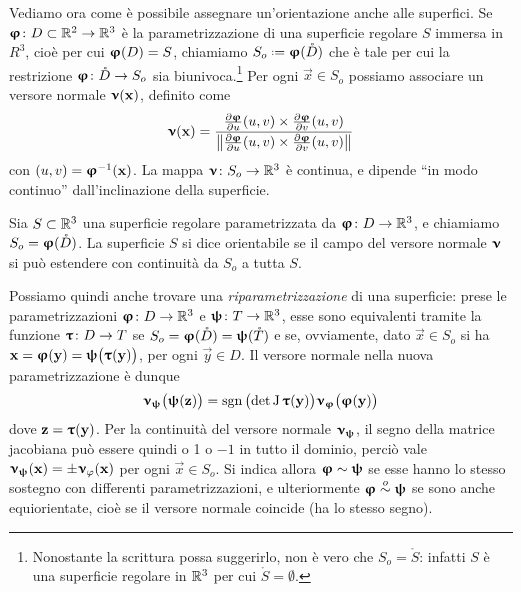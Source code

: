 Vediamo ora come è possibile assegnare un'orientazione anche alle superfici.
Se $\bm{\upvarphi}\colon D\subset\mathbb{R}^2\to\mathbb{R}^3$ è la parametrizzazione di una superficie regolare $S$ immersa in $R^3$, cioè per cui $\bm{\upvarphi}(D)=S$, chiamiamo $S_o\defeq\vphi(\mathring{D})$ che è tale per cui la restrizione $\bm{\upvarphi}\colon\mathring{D}\to S_o$ sia biunivoca.\footnote{
	Nonostante la scrittura possa suggerirlo, non è vero che $S_o=\mathring{S}$: infatti $S$ è una superficie regolare in $\mathbb{R}^3$ per cui $\mathring{S}=\emptyset$.
}
Per ogni $\vec x\in S_o$ possiamo associare un versore normale $\bm{\upnu}(\mathbf{x})$, definito come
\begin{equation}
	\bm{\upnu}(\mathbf{x})=\frac{\frac{\partial {\bm{\upvarphi}}}{\partial {u}}(u,v)\times\frac{\partial {\bm{\upvarphi}}}{\partial {v}}(u,v)}{\left\|{\frac{\partial {\bm{\upvarphi}}}{\partial {u}}(u,v)\times\frac{\partial {\bm{\upvarphi}}}{\partial {v}}(u,v)}\right\|}
\end{equation}
con $(u,v)=\bm{\upvarphi}^{-1}(\mathbf{x})$.
La mappa $\bm{\upnu}\colon S_o\to\mathbb{R}^3$ è continua, e dipende ``in modo continuo'' dall'inclinazione della superficie.
\begin{definizione} \label{d:superficie-orientabile}
	Sia $S\subset\mathbb{R}^3$ una superficie regolare parametrizzata da $\bm{\upvarphi}\colon D\to\mathbb{R}^3$, e chiamiamo $S_o=\bm{\upvarphi}(\mathring{D})$.
	La superficie $S$ si dice orientabile se il campo del versore normale $\bm{\upnu}$ si può estendere con continuità da $S_o$ a tutta $S$.
\end{definizione}
Possiamo quindi anche trovare una \emph{riparametrizzazione} di una superficie: prese le parametrizzazioni $\bm{\upvarphi}\colon D\to\mathbb{R}^3$ e $\bm{\uppsi}\colon T\to\mathbb{R}^3$, esse sono equivalenti tramite la funzione $\bm{\uptau}\colon D\to T$ se $S_o=\bm{\upvarphi}(\mathring{D})=\bm{\uppsi}(\mathring{T})$ e se, ovviamente, dato $\vec x\in S_o$ si ha $\mathbf{x}=\bm{\upvarphi}(\mathbf{y})=\bm{\uppsi}\big(\bm{\uptau}(\mathbf{y})\big)$, per ogni $\vec y\in D$.
Il versore normale nella nuova parametrizzazione è dunque
\begin{equation}
	\bm{\upnu}_{\bm{\uppsi}}\big(\bm{\uppsi}(\mathbf{z})\big)=\operatorname{sgn}\big(\!\det\operatorname{J}\bm{\uptau}(\mathbf{y})\big)\bm{\upnu}_{\bm{\upvarphi}}\big(\bm{\upvarphi}(\mathbf{y})\big)
\end{equation}
dove $\mathbf{z}=\bm{\uptau}(\mathbf{y})$.
Per la continuità del versore normale $\bm{\upnu}_{\bm{\uppsi}}$, il segno della matrice jacobiana può essere quindi o 1 o $-1$ in tutto il dominio, perciò vale $\bm{\upnu}_{\bm{\uppsi}}(\mathbf{x})=\pm\bm{\upnu}_{\varphi}(\mathbf{x})$ per ogni $\vec x\in S_o$.
Si indica allora $\bm{\upvarphi}\sim\bm{\uppsi}$ se esse hanno lo stesso sostegno con differenti parametrizzazioni, e ulteriormente $\bm{\upvarphi}\overset{o}{\sim}\bm{\uppsi}$ se sono anche equiorientate, cioè se il versore normale coincide (ha lo stesso segno).

